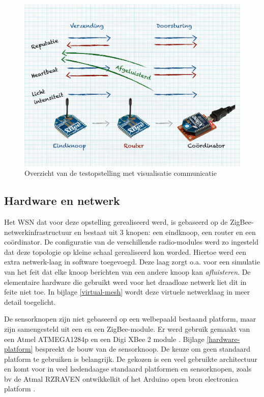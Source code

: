\begin{figure}[ht]
  \centering
  \includegraphics[width=0.75\linewidth]{resources/setup.pdf}
  \caption{Overzicht van de testopstelling met visualisatie communicatie}
  \label{fig:setup}
\end{figure}

\vspace{-5mm}

\subsection{Hardware en netwerk}
\label{subsection:eval-hardware}

Het WSN dat voor deze opstelling gerealiseerd werd, is gebaseerd op de
ZigBee-netwerkinfrastructuur en bestaat uit 3 knopen: een eindknoop, een router
en een co\"ordinator. De configuratie van de verschillende radio-modules werd
zo ingesteld dat deze topologie op kleine schaal gerealiseerd kon worded.
Hiertoe werd een extra netwerk-laag in software toegevoegd. Deze laag zorgt
o.a. voor een simulatie van het feit dat elke knoop berichten van een andere
knoop kan \emph{afluisteren}. De elementaire hardware die gebruikt werd voor
het draadloze netwerk liet dit in feite niet toe. In bijlage \ref{virtual-mesh}
wordt deze virtuele netwerklaag in meer detail toegelicht.

De sensorknopen zijn niet gebaseerd op een welbepaald bestaand platform, maar
zijn samengesteld uit een \mcu en een ZigBee-module. Er werd gebruik gemaakt
van een Atmel ATMEGA1284p \citep{datasheet:atmega1284p} en een Digi XBee 2
module \citep{manual:xbee}. Bijlage \ref{hardware-platform} bespreekt de bouw
van de sensorknoop. De keuze om geen standaard platform te gebruiken is
belangrijk. De gekozen \mcu is een veel gebruikte architectuur en komt voor in
veel hedendaagse standaard platformen en sensorknopen, zoals bv de Atmal
RZRAVEN ontwikkelkit \citep{manual:rzraven} of het Arduino open bron
electronica platform \citep{url:arduino}.

